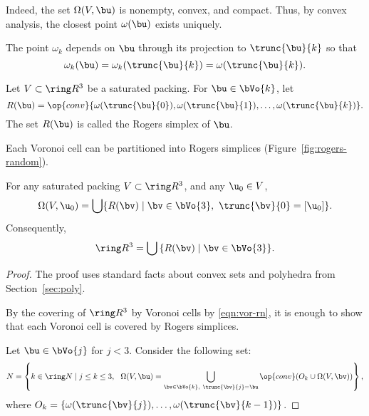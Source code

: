\begin{cnl}
\figHFFTUNW %

  Indeed,
the set $\Omega(V, \bu)$ is nonempty, convex, and compact.  Thus, by
convex analysis, the closest point $\omega( \bu)$ exists uniquely.

The point $\omega_k$ depends on $\bu$ through its projection to
$\trunc{\bu}{k}$ so that
\[
\omega_k(\bu) = \omega_k(\trunc{\bu}{k})=\omega(\trunc{\bu}{k}).
\]
%


\begin{definition}
\label{def:Rogers-simplex}
%
Let $V\subset\vecR{3}$ be a saturated packing. For $\bu\in \bVo{k}$, let 
\[
 R(\bu) = \op{conv}\{\omega( \trunc{\bu}{0}), \omega(
 \trunc{\bu}{1}),\ldots,\omega( \trunc{\bu}{k})\}.
\]
The set $R(\bu)$ is called the Rogers simplex of $\bu$.
\end{definition}

Each Voronoi cell can be partitioned into Rogers simplices (Figure~\ref{fig:rogers-random}).

\figBUGZBTW %


\begin{lemma}
\label{lemma:Rogers-d}
For any saturated packing $V\subset\vecR{3}$, and any $\u_0\in V$,
\begin{equation} 
\Omega(V,\u_0) = \bigcup \setcomp{ R(\bv) }{ \bv\in \bVo{3},~\trunc{\bv}{0} =[\u_0]}.
\end{equation}
Consequently,
\[ 
\vecR{3} = \bigcup\, \setcomp{ R(\bv) }{ \bv\in\bVo{3}}.
\] 
\end{lemma}


\begin{proof} 
The proof uses standard facts about convex sets and polyhedra from
Section~\ref{sec:poly}.

By the covering of $\vecR{3}$  by Voronoi cells by \eqref{eqn:vor-rn},
it is enough to show that each Voronoi cell is covered by Rogers
simplices.

Let $\bu\in \bVo{j}$ for $j<3$.
Consider the following set:
\[  
N = \left\{k\in\Nat\mid j\le k\le 3, ~~\Omega(V,\bu) 
= \bigcup_{\bv \in \bVo{k},~\trunc{\bv}{j}=\bu}
\op{conv}(O_k \cup\Omega(V,\bv)) 
\right\},
\] 
where $O_k = \{\omega(\trunc{\bv}{j}),\ldots,\omega(\trunc{\bv}{k-1})\}$.


\end{proof}
\end{cnl}
